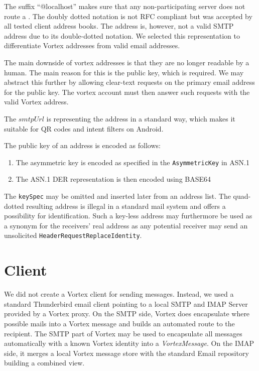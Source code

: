 The suffix ``@localhost'' makes sure that any non-participating server does not route a \VortexMessageunintentionally. The doubly dotted notation is not RFC compliant but was accepted by all tested client address books. The address is, however, not a valid SMTP address due to its double-dotted notation. We selected this representation to differentiate Vortex addresses from valid email addresses.

The main downside of vortex addresses is that they are no longer readable by a human. The main reason for this is the public key, which is required. We may abstract this further by allowing clear-text requests on the primary email address for the public key. The vortex account must then answer such requests with the valid Vortex address.

The $smtpUrl$ is representing the address in a standard way, which makes it suitable for QR codes and intent filters on Android.

The public key of an address is encoded as follows:
\begin{enumerate}
	\item The asymmetric key is encoded as specified in the \texttt{AsymmetricKey} in ASN.1
	\item The ASN.1 DER representation is then encoded using BASE64
\end{enumerate}    

The \texttt{keySpec} may be omitted and inserted later from an address list. The quad-dotted resulting address is illegal in a standard mail system and offers a possibility for identification. Such a key-less address may furthermore be used as a synonym for the receivers' real address as any potential receiver may send an unsolicited \texttt{HeaderRequestReplaceIdentity}.

\section{Client}
We did not create a Vortex client for sending messages. Instead, we used a standard Thunderbird email client pointing to a local SMTP and IMAP Server provided by a Vortex proxy. On the SMTP side, Vortex does encapsulate where possible mails into a Vortex message and builds an automated route to the recipient. The SMTP part of Vortex may be used to encapsulate all messages automatically with a known Vortex identity into a \emph{VortexMessage}. On the IMAP side, it merges a local Vortex message store with the standard Email repository building a combined view.

